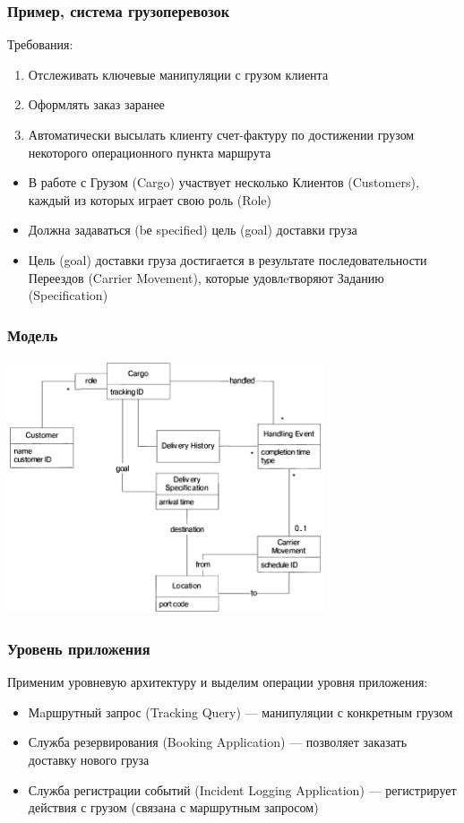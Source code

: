 \documentclass[xetex,mathserif,serif]{beamer}
\begin{document}
	\begin{frame}
		\frametitle{Пример, система грузоперевозок}
		Требования:
		\begin{enumerate}
			\item Отслеживать ключевые манипуляции с грузом клиента
			\item Оформлять заказ заранее
			\item Автоматически высылать клиенту счет-фактуру по достижении грузом некоторого операционного пункта маршрута
		\end{enumerate}

		\begin{itemize}
			\item В работе с Грузом (Cargo) участвует несколько Клиентов (Customers), каждый из которых играет свою роль (Role)
			\item Должна задаваться (bе specified) цель (goal) доставки груза
			\item Цель (goal) доставки груза достигается в результате последовательности Переездов (Carrier Movement), которые удовлeтворяют Заданию (Specification)
		\end{itemize}
	\end{frame}

	\begin{frame}
		\frametitle{Модель}
		\begin{center}
			\includegraphics[width=0.7\textwidth]{cargoModel.png}
		\end{center}
	\end{frame}

	\begin{frame}
		\frametitle{Уровень приложения}
		Применим уровневую архитектуру и выделим операции уровня приложения:
		\begin{itemize}
			\item Мaршрутный запрос (Tracking Query) --- манипуляции с конкретным грузом
			\item Служба резервирования (Booking Application) --- позволяет заказать доставку нового груза
			\item Служба регистрации событий (Incident Logging Application) --- регистрирует действия с грузом (связана с маршрутным запросом)
		\end{itemize}
	\end{frame}
\end{document}
